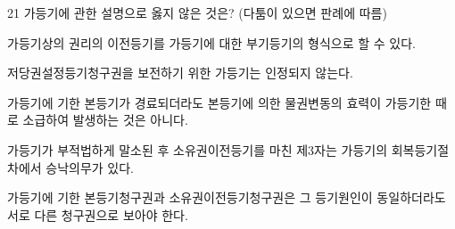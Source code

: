 \begin{question}{21}
가등기에 관한 설명으로 옳지 않은 것은? (다툼이 있으면 판례에 따름)
\begin{choices}
  \item 가등기상의 권리의 이전등기를 가등기에 대한 부기등기의 형식으로 할 수 있다.
  \item 저당권설정등기청구권을 보전하기 위한 가등기는 인정되지 않는다.
  \item 가등기에 기한 본등기가 경료되더라도 본등기에 의한 물권변동의 효력이 가등기한 때로 소급하여 발생하는 것은 아니다.
  \item 가등기가 부적법하게 말소된 후 소유권이전등기를 마친 제3자는 가등기의 회복등기절차에서 승낙의무가 있다.
  \item 가등기에 기한 본등기청구권과 소유권이전등기청구권은 그 등기원인이 동일하더라도 서로 다른 청구권으로 보아야 한다.
\end{choices}
\end{question}
